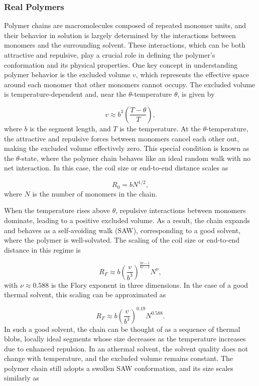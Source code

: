 \documentclass{article}      %
\begin{document}
\subsubsection{Real Polymers}

Polymer chains are macromolecules composed of repeated monomer units, and their behavior in solution is largely determined by the interactions between monomers and the surrounding solvent. These interactions, which can be both attractive and repulsive, play a crucial role in defining the polymer's conformation and its physical properties. One key concept in understanding polymer behavior is the excluded volume \( v \), which represents the effective space around each monomer that other monomers cannot occupy. The excluded volume is temperature-dependent and, near the \(\theta\)-temperature \( \theta \), is given by

\[
v \approx b^3 \left( \frac{T - \theta}{T} \right),
\]
where \( b \) is the segment length, and \( T \) is the temperature. At the \(\theta\)-temperature, the attractive and repulsive forces between monomers cancel each other out, making the excluded volume effectively zero. This special condition is known as the \(\theta\)-state, where the polymer chain behaves like an ideal random walk with no net interaction. In this case, the coil size or end-to-end distance scales as

\[
R_0 = b N^{1/2},
\]
where \( N \) is the number of monomers in the chain.

When the temperature rises above \( \theta \), repulsive interactions between monomers dominate, leading to a positive excluded volume. As a result, the chain expands and behaves as a self-avoiding walk (SAW), corresponding to a good solvent, where the polymer is well-solvated. The scaling of the coil size or end-to-end distance in this regime is

\[
R_F \approx b \left( \frac{v}{b^3} \right)^{\frac{2\nu - 1}{6\nu - 2}} N^\nu,
\]
with \( \nu \approx 0.588 \) is the Flory exponent in three dimensions. In the case of a good thermal solvent, this scaling can be approximated as

\[
R_F \approx b \left( \frac{v}{b^3} \right)^{0.19} N^{0.588}.
\]
In such a good solvent, the chain can be thought of as a sequence of thermal blobs, locally ideal segments whose size decreases as the temperature increases due to enhanced repulsion. In an athermal solvent, the solvent quality does not change with temperature, and the excluded volume remains constant. The polymer chain still adopts a swollen SAW conformation, and its size scales similarly as
\end{document}
